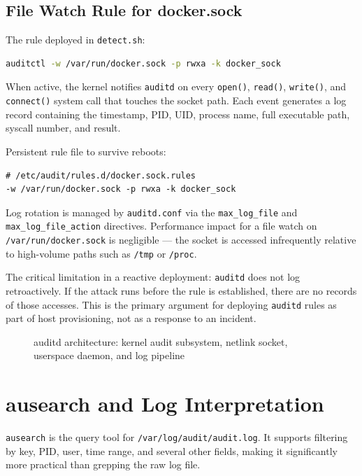 \subsection{File Watch Rule for docker.sock}

The rule deployed in \texttt{detect.sh}:

\begin{lstlisting}[language=bash]
auditctl -w /var/run/docker.sock -p rwxa -k docker_sock
\end{lstlisting}

When active, the kernel notifies \texttt{auditd} on every \texttt{open()}, \texttt{read()}, \texttt{write()}, and \texttt{connect()} system call that touches the socket path. Each event generates a log record containing the timestamp, PID, UID, process name, full executable path, syscall number, and result.

Persistent rule file to survive reboots:

\begin{lstlisting}
# /etc/audit/rules.d/docker.sock.rules
-w /var/run/docker.sock -p rwxa -k docker_sock
\end{lstlisting}

Log rotation is managed by \texttt{auditd.conf} via the \texttt{max\_log\_file} and \texttt{max\_log\_file\_action} directives. Performance impact for a file watch on \texttt{/var/run/docker.sock} is negligible --- the socket is accessed infrequently relative to high-volume paths such as \texttt{/tmp} or \texttt{/proc}.

The critical limitation in a reactive deployment: \texttt{auditd} does not log retroactively. If the attack runs before the rule is established, there are no records of those accesses. This is the primary argument for deploying \texttt{auditd} rules as part of host provisioning, not as a response to an incident.

\begin{figure}[h]
\centering
\vspace{3cm}
\caption{auditd architecture: kernel audit subsystem, netlink socket, userspace daemon, and log pipeline}
\end{figure}


\section{ausearch and Log Interpretation}

\texttt{ausearch} is the query tool for \texttt{/var/log/audit/audit.log}. It supports filtering by key, PID, user, time range, and several other fields, making it significantly more practical than grepping the raw log file.

